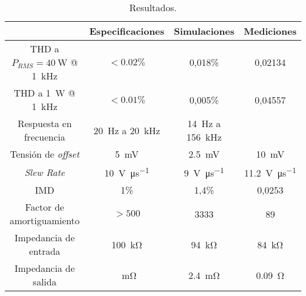\begin{table}[H]
	\centering
	\begin{tabular}{cccc}
		\toprule
		& Especificaciones & Simulaciones & Mediciones \\
		\midrule
		THD a $P_{\textit{RMS}} = \SI{40}{\watt}$ @ \SI{1}{\kilo\hertz}& $< \num{0.02}\%$ &  0,018\% & 0,02134\\
		THD a \SI{1}{\watt} @ \SI{1}{\kilo\hertz} & $< \num{0.01}\%$ & 0,005\% & 0,04557\\
		Respuesta en frecuencia & \SI{20}{\hertz} a \SI{20}{\kilo\hertz} & \SI{14}{\hertz} a \SI{156}{\kilo\hertz} & \\
		Tensión de \textit{offset} & \SI{5}{\milli\volt} & \SI{2.5}{\milli\volt} & \SI{10}{\milli\volt} \\
		\textit{Slew Rate} & \SI{10}{\volt\per\micro\second} &  \SI{9}{\volt\per\micro\second} & \SI{11.2}{\volt\per\micro\second}\\
		IMD & 1\% & 1,4\% & 0,0253\\
		Factor de amortiguamiento & $>500$ & 3333 & 89 \\
		Impedancia de entrada & \SI{100}{\kilo\ohm} & \SI{94}{\kilo\ohm} & \SI{84}{\kilo\ohm} \\
		Impedancia de salida & \SI{}{\milli\ohm} & \SI{2.4}{\milli\ohm} & \SI{0.09}{\ohm} \\
		\bottomrule
	\end{tabular}
	\caption{Resultados.}
	\label{tab.resultados}
\end{table}